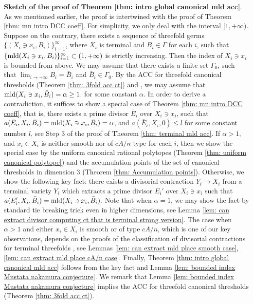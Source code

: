 \documentclass[11pt]{amsart}
\numberwithin{equation}{section}
\newcommand{\mld}{{\rm{mld}}}
\newcommand{\Ii}{{\Gamma}}
\theoremstyle{definition}
\theoremstyle{definition}
\begin{document}
\noindent\textbf{Sketch of the proof of Theorem \ref{thm: intro global canonical mld acc}}. As we mentioned earlier, the proof is intertwined with the proof of Theorem \ref{thm: mn intro DCC coeff}. For simplicity, we only deal with the interval $[1,+\infty)$. Suppose on the contrary, there exists a sequence of threefold germs $\{(X_i\ni x_i, B_i)\}_{i=1}^{\infty}$, where $X_i$ is terminal and $B_i\in\Ii$ for each $i$, such that $\{\mld(X_i\ni x_i,B_i)\}_{i=1}^{\infty}\subset(1,+\infty)$ is strictly increasing. Then the index of $X_i\ni x_i$ is bounded from above. We may assume that there exists a finite set $\Ii_0$, such that $\lim_{i\to +\infty}B_i=\bar{B}_i$ and $\bar{B}_i\in\Ii_0$. By the ACC for threefold canonical thresholds (Theorem \ref{thm: 3fold acc ct}) and \cite[Corollary 1.3]{Nak16}, we may assume that $\mld(X_i\ni x_i,\bar{B}_i)=\alpha\ge 1$. for some constant $\alpha$. In order to derive a contradiction, it suffices to show a special case of Theorem \ref{thm: mn intro DCC coeff}, that is, there exists a prime divisor $\bar{E}_i$ over $X_i\ni x_i$, such that 
$a(\bar{E}_i,X_i,\bar{B}_i)=\mld(X_i\ni x_i,\bar{B}_i)=\alpha$, and $a(\bar{E}_i,X_i,0)\le l$ for some constant number $l$, see Step 3 of the proof of Theorem \ref{thm:  terminal mld acc}. If $\alpha>1$, and $x_i\in X_i$ is neither smooth nor of $cA/n$ type for each $i$, then we show the special case by the uniform canonical rational polytopes (Theorem \ref{thm: uniform canonical polytope}) and the accumulation points of the set of canonical thresholds in dimension 3 (Theorem \ref{thm: Accumulation points}). Otherwise, we show the following key fact: there exists a divisorial contraction $Y_i\to X_i$ from a terminal variety $Y_i$ which extracts a prime divisor $E_i'$ over $X_i\ni x_i$ such that $a(E_i',X_i,\bar{B}_i)=\mld(X_i\ni x_i,\bar{B}_i)$. Note that when $\alpha=1$, we may show the fact by standard tie breaking trick even in higher dimensions, see Lemma \ref{lem: can extract divisor computing ct that is terminal strong version}. The case when $\alpha>1$ and either $x_i\in X_i$ is smooth or of type $cA/n$, which is one of our key observations, depends on the proofs of the classification of divisorial contractions for terminal threefolds \cite{Kaw01,Kaw02,Kaw03,Kaw05,Yam18}, see Lemmas \ref{lem: can extract mld place smooth case}, \ref{lem: can extract mld place cA/n case}. Finally, Theorem \ref{thm: intro global canonical mld acc} follows from the key fact and Lemma \ref{lem: bounded index Mustata nakamura conjecture}. We remark that Lemma \ref{lem: bounded index Mustata nakamura conjecture} implies the ACC for threefold canonical thresholds (Theorem \ref{thm: 3fold acc ct}).
\end{document}
